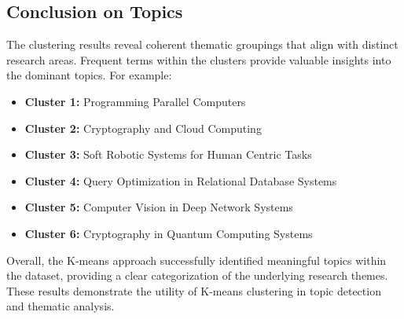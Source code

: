 \subsection{Conclusion on Topics}
The clustering results reveal coherent thematic groupings that align with distinct research areas. Frequent terms within the clusters provide valuable insights into the dominant topics. For example:
\begin{itemize}
    \item \textbf{Cluster 1:} Programming Parallel Computers
    \item \textbf{Cluster 2:} Cryptography and Cloud Computing
    \item \textbf{Cluster 3:} Soft Robotic Systems for Human Centric Tasks
    \item \textbf{Cluster 4:} Query Optimization in Relational Database Systems
    \item \textbf{Cluster 5:} Computer Vision in Deep Network Systems
    \item \textbf{Cluster 6:} Cryptography in Quantum Computing Systems
\end{itemize}

Overall, the K-means approach successfully identified meaningful topics within the dataset, providing a clear categorization of the underlying research themes. These results demonstrate the utility of K-means clustering in topic detection and thematic analysis.